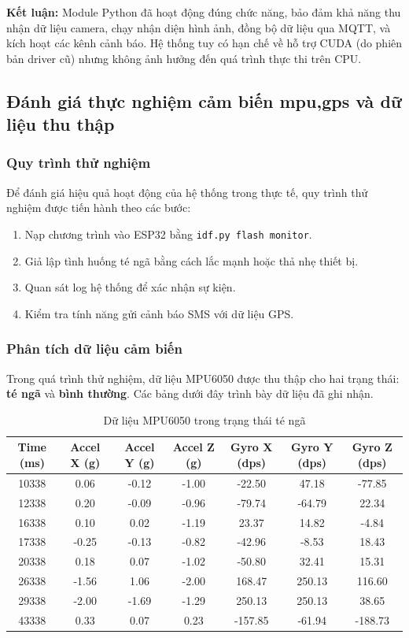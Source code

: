 \textbf{Kết luận:} Module Python đã hoạt động đúng chức năng, bảo đảm khả năng thu nhận dữ liệu camera, chạy nhận diện hình ảnh, đồng bộ dữ liệu qua MQTT, và kích hoạt các kênh cảnh báo. Hệ thống tuy có hạn chế về hỗ trợ CUDA (do phiên bản driver cũ) nhưng không ảnh hưởng đến quá trình thực thi trên CPU.

\subsection{Đánh giá thực nghiệm cảm biến mpu,gps và dữ liệu thu thập}
\subsubsection*{Quy trình thử nghiệm}
Để đánh giá hiệu quả hoạt động của hệ thống trong thực tế, quy trình thử nghiệm được tiến hành theo các bước:
\begin{enumerate}
    \item Nạp chương trình vào ESP32 bằng \texttt{idf.py flash monitor}.  
    \item Giả lập tình huống té ngã bằng cách lắc mạnh hoặc thả nhẹ thiết bị.  
    \item Quan sát log hệ thống để xác nhận sự kiện.  
    \item Kiểm tra tính năng gửi cảnh báo SMS với dữ liệu GPS.  
\end{enumerate}

\subsubsection*{Phân tích dữ liệu cảm biến}
Trong quá trình thử nghiệm, dữ liệu MPU6050 được thu thập cho hai trạng thái: \textbf{té ngã} và \textbf{bình thường}.  
Các bảng dưới đây trình bày dữ liệu đã ghi nhận.


\begin{table}[H]
\centering
\caption{Dữ liệu MPU6050 trong trạng thái té ngã}
\label{tab:fall_log_data}
\begin{tabular}{|c|c|c|c|c|c|c|}
\hline
\textbf{Time (ms)} & \textbf{Accel X (g)} & \textbf{Accel Y (g)} & \textbf{Accel Z (g)} & \textbf{Gyro X (dps)} & \textbf{Gyro Y (dps)} & \textbf{Gyro Z (dps)} \\
\hline
10338 & 0.06 & -0.12 & -1.00 & -22.50 & 47.18 & -77.85 \\
12338 & 0.20 & -0.09 & -0.96 & -79.74 & -64.79 & 22.34 \\
16338 & 0.10 & 0.02  & -1.19 & 23.37  & 14.82  & -4.84 \\
17338 & -0.25 & -0.13 & -0.82 & -42.96 & -8.53  & 18.43 \\
20338 & 0.18 & 0.07  & -1.02 & -50.80 & 32.41  & 15.31 \\
26338 & -1.56 & 1.06  & -2.00 & 168.47 & 250.13 & 116.60 \\
29338 & -2.00 & -1.69 & -1.29 & 250.13 & 250.13 & 38.65 \\
43338 & 0.33 & 0.07  & 0.23  & -157.85 & -61.94 & -188.73 \\
\hline
\end{tabular}
\end{table}

